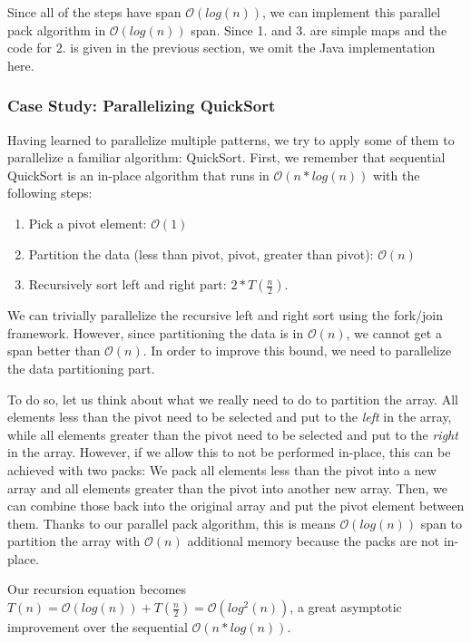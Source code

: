 \documentclass[main.tex]{subfiles}
\begin{document}
\noindent Since all of the steps have span \(\mathcal{O}(log(n))\), we can implement this parallel pack algorithm in \(\mathcal{O}(log(n))\) span. Since 1. and 3. are simple maps and the code for 2. is given in the previous section, we omit the Java implementation here.

\subsubsection{Case Study: Parallelizing QuickSort}
Having learned to parallelize multiple patterns, we try to apply some of them to parallelize a familiar algorithm: QuickSort. First, we remember that sequential QuickSort is an in-place algorithm that runs in \(\mathcal{O}(n*log(n))\) with the following steps:

\begin{enumerate}
  \item Pick a pivot element: \(\mathcal{O}(1)\)
  \item Partition the data (less than pivot, pivot, greater than pivot): \(\mathcal{O}(n)\)
  \item Recursively sort left and right part: \(2*T\left(\frac{n}{2}\right)\).
\end{enumerate}

\noindent We can trivially parallelize the recursive left and right sort using the fork/join framework. However, since partitioning the data is in \(\mathcal{O}(n)\), we cannot get a span better than \(\mathcal{O}(n)\). In order to improve this bound, we need to parallelize the data partitioning part.

To do so, let us think about what we really need to do to partition the array. All elements less than the pivot need to be selected and put to the \textit{left} in the array, while all elements greater than the pivot need to be selected and put to the \textit{right} in the array. However, if we allow this to not be performed in-place, this can be achieved with two packs: We pack all elements less than the pivot into a new array and all elements greater than the pivot into another new array. Then, we can combine those back into the original array and put the pivot element between them. Thanks to our parallel pack algorithm, this is means \(\mathcal{O}(log(n))\) span to partition the array with \(\mathcal{O}(n)\) additional memory because the packs are not in-place.

Our recursion equation becomes \(T(n)=\mathcal{O}(log(n))+T\left(\frac{n}{2}\right)=\mathcal{O}(log^{2}(n))\), a great asymptotic improvement over the sequential \(\mathcal{O}(n*log(n))\).
\end{document}
